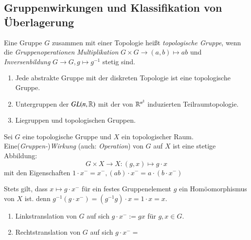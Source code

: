 \documentclass[a4paper,10pt]{scrartcl}
\begin{document}
\subsection{Gruppenwirkungen und Klassifikation von Überlagerung}
\begin{df}
 Eine Gruppe $G$ zusammen mit einer Topologie heißt \emph{topologische Gruppe}, wenn die \emph{Gruppenoperationen} \emph{Multiplikation} $G\times G \to (a,b)\mapsto ab$ und \emph{Inversenbildung}
$G\to G, g\mapsto g^{-1}$ stetig sind.
\end{df}
\begin{exs*}
 \begin{enumerate}[1)]
  \item Jede abstrakte Gruppe mit der diskreten Topologie ist eine topologische Gruppe.
  \item Untergruppen der $GL(n, \mathbb{R})$ mit der von $\mathbb{R}^{n^2}$ induzierten Teilraumtopologie.  
  \item Liegruppen und topologischen Gruppen.
 \end{enumerate}
\end{exs*}
\begin{df}
 Sei $G$ eine topologische Gruppe und $X$ ein topologischer Raum. Eine(\emph{Gruppen-})\emph{Wirkung} (auch: \emph{Operation}) von $G$ auf $X$ ist eine stetige Abbildung:
\[
 G\times X\to X: (g,x) \mapsto g\cdot x
\]
mit den Eigenschaften $1\cdot x^{-} = x^{-}, (ab)\cdot x^{-}=a\cdot (b\cdot x^{-})$
\end{df}
\begin{note*}
 Stets gilt, dass $x\mapsto g\cdot x^{-}$ für ein festes Gruppenelement $g$ ein Homöomorphismus von $X$ ist. denn $g^{-1}(g\cdot x^{-})=(g^{-1}g)\cdot x=1\cdot x=x.$
\end{note*}
\begin{exs*}
 \begin{enumerate}[1)]
  \item Linkstranslation von $G$ auf sich $g\cdot x^{-}:=gx$ für $g,x\in G$.
  \item Rechtstranslation von $G$ auf sich $g\cdot x^{-}=$
 \end{enumerate}

\end{exs*}
\end{document}
